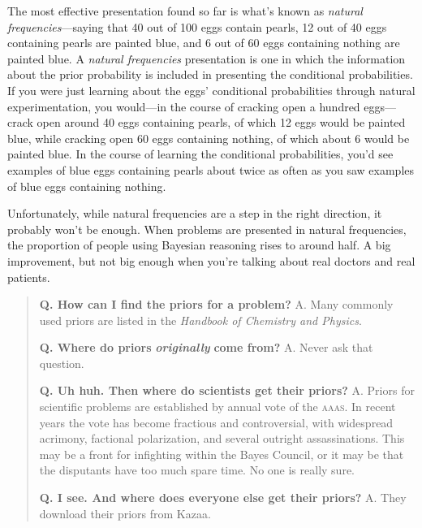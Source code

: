 {{{
 The most effective presentation found so far is
what's known as \textit{natural frequencies}{}---saying
that 40 out of 100 eggs contain pearls, 12 out of 40 eggs containing
pearls are painted blue, and 6 out of 60 eggs containing nothing are
painted blue. A \textit{natural frequencies} presentation is one in
which the information about the prior probability is included in
presenting the conditional probabilities. If you were just learning
about the eggs' conditional probabilities through
natural experimentation, you would---in the course of cracking open a
hundred eggs---crack open around 40 eggs containing pearls, of which 12
eggs would be painted blue, while cracking open 60 eggs containing
nothing, of which about 6 would be painted blue. In the course of
learning the conditional probabilities, you'd see
examples of blue eggs containing pearls about twice as often as you saw
examples of blue eggs containing nothing.}

{
 Unfortunately, while natural frequencies are a step in the right
direction, it probably won't be enough. When problems
are presented in natural frequencies, the proportion of people using
Bayesian reasoning rises to around half. A big improvement, but not big
enough when you're talking about real doctors and real
patients.}

\hr

\begin{quote}
{
 \textbf{Q. How can I find the priors for a problem?}\newline
 A. Many commonly used priors are listed in the \textit{Handbook of
Chemistry and Physics}.}

{
 \textbf{Q. Where do priors }\textbf{\textit{originally}}\textbf{
come from?}\newline
 A. Never ask that question.}

{
 \textbf{Q. Uh huh. Then where do scientists get their
priors?}\newline
 A. Priors for scientific problems are established by annual vote of the
\textsc{aaas}. In recent years the vote has become fractious and controversial,
with widespread acrimony, factional polarization, and several outright
assassinations. This may be a front for infighting within the Bayes
Council, or it may be that the disputants have too much spare time. No
one is really sure.}

{
 \textbf{Q. I see. And where does everyone else get their
priors?}\newline
 A. They download their priors from Kazaa.}


\end{quote}}}
